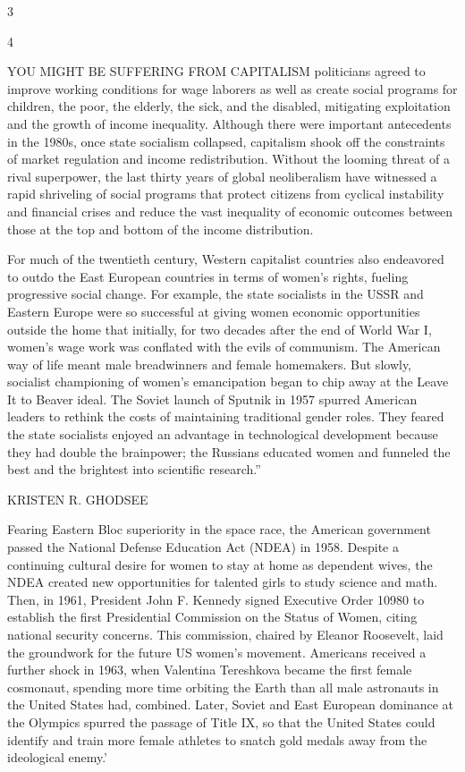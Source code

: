  \par 
3
 \par 
4
 \par 
YOU MIGHT BE SUFFERING FROM CAPITALISM politicians agreed to improve working conditions for wage laborers as well as create social programs for children, the poor, the elderly, the sick, and the disabled, mitigating exploitation and the growth of income inequality. Although there were important antecedents in the 1980s, once state socialism collapsed, capitalism shook off the constraints of market regulation and income redistribution. Without the looming threat of a rival superpower, the last thirty years of global neoliberalism have witnessed a rapid shriveling of social programs that protect citizens from cyclical instability and financial crises and reduce the vast inequality of economic outcomes between those at the top and bottom of the income distribution.
 \par 
For much of the twentieth century, Western capitalist countries also endeavored to outdo the East European countries in terms of women’s rights, fueling progressive social change. For example, the state socialists in the USSR and Eastern Europe were so successful at giving women economic opportunities outside the home that initially, for two decades after the end of World War I, women’s wage work was conflated with the evils of communism. The American way of life meant male breadwinners and female homemakers. But slowly, socialist championing of women’s emancipation began to chip away at the Leave It to Beaver ideal. The Soviet launch of Sputnik in 1957 spurred American leaders to rethink the costs of maintaining traditional gender roles. They feared the state socialists enjoyed an advantage in technological development because they had double the brainpower; the Russians educated women and funneled the best and the brightest into scientific research.”
 \par 
KRISTEN R. GHODSEE
 \par 
Fearing Eastern Bloc superiority in the space race, the American government passed the National Defense Education Act (NDEA) in 1958. Despite a continuing cultural desire for women to stay at home as dependent wives, the NDEA created new opportunities for talented girls to study science and math. Then, in 1961, President John F. Kennedy signed Executive Order 10980 to establish the first Presidential Commission on the Status of Women, citing national security concerns. This commission, chaired by Eleanor Roosevelt, laid the groundwork for the future US women’s movement. Americans received a further shock in 1963, when Valentina Tereshkova became the first female cosmonaut, spending more time orbiting the Earth than all male astronauts in the United States had, combined. Later, Soviet and East European dominance at the Olympics spurred the passage of Title IX, so that the United States could identify and train more female athletes to snatch gold medals away from the ideological enemy.’

